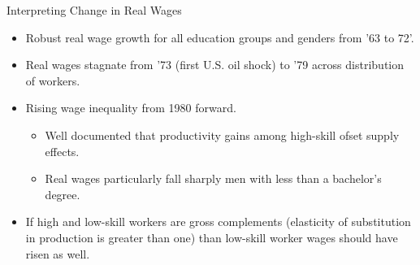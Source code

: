 \documentclass{beamer}
\begin{document}
\begin{frame}{Interpreting Change in Real Wages}

\begin{itemize}
	
	\item Robust real wage growth for all education groups and genders from '63 to 72'.
	
	\item Real wages stagnate from '73 (first U.S. oil shock) to '79 across distribution of workers.
	
	\item Rising wage inequality from 1980 forward.
	\begin{itemize}
		\item Well documented that productivity gains among high-skill ofset supply effects.
		\item Real wages particularly fall sharply men with less than a bachelor's degree.
	\end{itemize}

	\item If high and low-skill workers are gross complements (elasticity of substitution in production is greater than one) than low-skill worker wages should have risen as well.

	
	
	
\end{itemize}

\end{frame}
\end{document}
